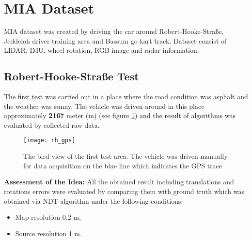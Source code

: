 \section{MIA Dataset}\label{sec:MIA-set}
MIA dataset was  created by driving the car around Robert-Hooke-Straße, Jeddeloh driver training area and Bassum go-kart track. Dataset consist of LIDAR, IMU, wheel rotation, RGB image and radar information.
\subsection{Robert-Hooke-Straße Test} The first test was carried out in a place where the road condition was asphalt and the weather was sunny. The vehicle was driven around in this place approximately \textbf{2167} meter (m) (see figure \ref{fig:rh_gps}) and the result of algorithms was evaluated by collected raw data.
\\
\begin{figure}[ht]
    \centering
    \texttt{[image: rh\_gps]}
    \caption{The bird view of the first test area. The vehicle was driven manually for data acquisition on the blue line which indicates the GPS trace}
    \label{fig:rh_gps}
\end{figure}

\noindent \textbf{Assessment of the Idea:} All the obtained result including translations and rotations errors were evaluated by comparing them with ground truth which was obtained via NDT algorithm under the following conditions:
\begin{itemize}
    \item Map resolution 0.2 m,
    \item Source resolution 1 m.
\end{itemize}

